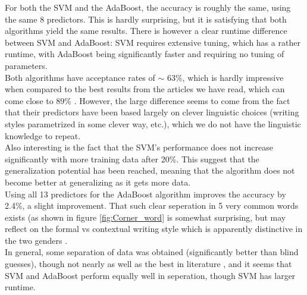 \noindent For both the SVM and the AdaBoost, the accuracy is roughly the same, using the same 8 predictors. This is hardly surprising, but it is satisfying that both algorithms yield the same results. There is however a clear runtime difference between SVM and AdaBoost: SVM requires extensive tuning, which has a rather runtime, with AdaBoost being significantly faster and requiring no tuning of parameters.\\

\noindent Both algorithms have acceptance rates of $\sim$ 63\%, which is hardly impressive when compared to the best results from the articles we have read, which can come close to 89\% \cite{other}. However, the large difference seems to come from the fact that their predictors have been based largely on clever linguistic choices (writing styles parametrized in some clever way, etc.), which we do not have the linguistic knowledge to repeat.\\

\noindent Also interesting is the fact that the SVM's performance does not increase significantly with more training data after 20\%. This suggest that the generalization potential has been reached, meaning that the algorithm does not become better at generalizing as it gets more data.\\

\noindent Using all 13 predictors for the AdaBoost algorithm improves the accuracy by 2.4\%, a slight improvement. That such clear seperation in 5 very common words exists (as shown in figure \ref{fig:Corner_word} is somewhat surprising, but may reflect on the formal vs contextual writing style which is apparently distinctive in the two genders \cite{data}.\\

\noindent In general, some separation of data was obtained (significantly better than blind guesses), though not nearly as well as the best in literature \cite{other}, and it seems that SVM and AdaBoost perform equally well in seperation, though SVM has larger runtime.